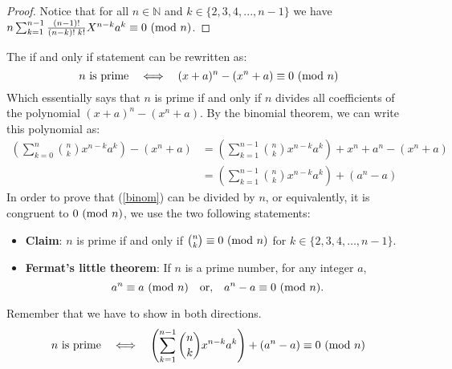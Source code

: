 \begin{proof}
Notice that for all $n \in \mathbb{N}$ and $k \in \{ 2,3,4,...,n-1 \}$ we have $n \sum_{k=1}^{n-1} \frac{(n-1)!}{(n-k)!\;k!} X^{n-k} a^{k} \equiv 0 \ (\mathrm{mod}\ n)$.

\end{proof}

The if and only if statement can be rewritten as:
\begin{equation*}
    \text{$n$ is prime}\quad\Longleftrightarrow\quad(x + a)^n - (x^n + a)\equiv 0 \ (\mathrm{mod}\ n)
\end{equation*}
Which essentially says that $n$ is prime if and only if $n$ divides all coefficients of the polynomial $(x+a)^n-(x^n+a)$. By the binomial theorem, we can write this polynomial as:
\begin{equation}
    \begin{split}    
        \left(\sum_{k=0}^{n} \binom{n}{k}x^{n-k}a^k\right)-\left(x^n+a \right)
        & =\left(\sum_{k=1}^{n-1} \binom{n}{k}x^{n-k}a^k\right)+ x^n +a^n-\left(x^n+a\right)
        \\ &= \left(\sum_{k=1}^{n-1} \binom{n}{k}x^{n-k}a^k\right) + \left(a^n-a\right)
    \end{split}
    \label{binom}
\end{equation}
In order to prove that (\ref{binom}) can be divided by $n$, or equivalently, it is congruent to $0 \ (\mathrm{mod}\ n)$, we use the two following statements:
\begin{itemize}
    \item \textbf{Claim}: $n$ is prime if and only if $\binom{n}{k}\equiv 0 \ (\mathrm{mod}\ n)$ for $k\in\{2,3,4,\dots,n-1\}$. 
    \item \textbf{Fermat's little theorem}: If $n$ is a prime number, for any integer $a$,
    \begin{equation*}
        a^n \equiv a \ (\mathrm{mod}\ n) \quad\text{or,}\quad a^n -a \equiv 0 \ (\mathrm{mod}\ n).
    \end{equation*}
\end{itemize}
Remember that we have to show in both directions.
\begin{equation*}
    \text{$n$ is prime}\quad\Longleftrightarrow\quad \left(\sum_{k=1}^{n-1} \binom{n}{k}x^{n-k}a^k\right) + (a^n-a)\equiv 0 \ (\mathrm{mod}\ n)
\end{equation*}

